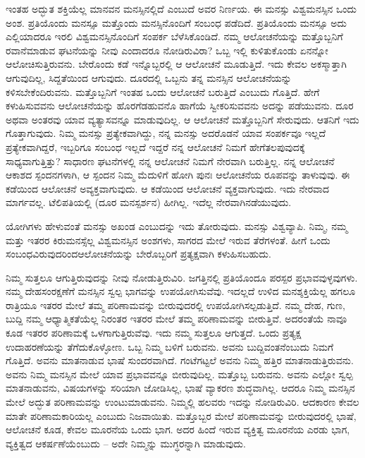 ಇಂತಹ ಅದ್ಭುತ ಶಕ್ತಿಯೆಲ್ಲ ಮಾನವನ ಮನಸ್ಸಿನಲ್ಲಿದೆ ಎಂಬುದೆ ಅವರ ನಿರ್ಣಯ. ಈ ಮನಸ್ಸು ವಿಶ್ವಮನಸ್ಸಿನ ಒಂದು ಅಂಶ. ಪ್ರತಿಯೊಂದು ಮನಸ್ಸೂ ಮತ್ತೊಂದು ಮನಸ್ಸಿನೊಂದಿಗೆ ಸಂಬಂಧ ಪಡೆದಿದೆ. ಪ್ರತಿಯೊಂದು ಮನಸ್ಸೂ ಅದು ಎಲ್ಲಿಯಾದರೂ ಇರಲಿ ವಿಶ್ವಮನಸ್ಸಿನೊಂದಿಗೆ ಸಂಪರ್ಕ ಬೆಳೆಸಿಕೊಂಡಿದೆ. ನಮ್ಮ ಆಲೋಚನೆಯನ್ನು ಮತ್ತೊಬ್ಬನಿಗೆ ರವಾನೆಮಾಡುವ ಘಟನೆಯನ್ನು ನೀವು ಎಂದಾದರೂ ನೋಡಿರುವಿರಾ? ಒಬ್ಬ ಇಲ್ಲಿ ಕುಳಿತುಕೊಂಡು ಏನನ್ನೋ ಆಲೋಚಿಸುತ್ತಿರುವನು. ಬೇರೊಂದು ಕಡೆ ಇನ್ನೊಬ್ಬರಲ್ಲಿ ಆ ಆಲೋಚನೆ ಮೂಡುತ್ತಿದೆ. ಇದು ಕೇವಲ ಅಕಸ್ಮಾತ್ತಾಗಿ ಆಗುವುದಿಲ್ಲ, ಸಿದ್ದತೆಯಿಂದ ಆಗುವುದು. ದೂರದಲ್ಲಿ ಒಬ್ಬನು ತನ್ನ ಮನಸ್ಸಿನ ಆಲೋಚನೆಯನ್ನು ಕಳಿಸಬೇಕೆಂದಿರುವನು. ಮತ್ತೊಬ್ಬನಿಗೆ ಇಂತಹ ಒಂದು ಆಲೋಚನೆ ಬರುತ್ತಿದೆ ಎಂಬುದು ಗೊತ್ತಿದೆ. ಹೇಗೆ ಕಳುಹಿಸುವವನು ಆಲೋಚನೆಯನ್ನು ಹೊರಗೆಡಹುವನೊ ಹಾಗೆಯೆ ಸ್ವೀಕರಿಸುವವನು ಅದನ್ನು ಪಡೆಯುವನು. ದೂರ ಅಥವಾ ಅಂತರವು ಯಾವ ವ್ಯತ್ಯಾಸವನ್ನೂ ಮಾಡುವುದಿಲ್ಲ. ಆ ಆಲೋಚನೆ ಮತ್ತೊಬ್ಬನಿಗೆ ಸೇರುವುದು. ಆತನಿಗೆ ಇದು ಗೊತ್ತಾಗುವುದು. ನಿಮ್ಮ ಮನಸ್ಸು ಪ್ರತ್ಯೇಕವಾಗಿದ್ದು, ನನ್ನ ಮನಸ್ಸು ಅದರೊಡನೆ ಯಾವ ಸಂಪರ್ಕವೂ ಇಲ್ಲದೆ ಪ್ರತ್ಯೇಕವಾಗಿದ್ದರೆ, ಇಬ್ಬರಿಗೂ ಸಂಬಂಧ ಇಲ್ಲದೆ ಇದ್ದರೆ ನನ್ನ ಆಲೋಚನೆ ನಿಮಗೆ ಹೇಗೆ\break ತಲಪುವುದಕ್ಕೆ ಸಾಧ್ಯವಾಗುತ್ತಿತ್ತು? ಸಾಧಾರಣ ಘಟನೆಗಳಲ್ಲಿ ನನ್ನ ಆಲೋಚನೆ ನಿಮಗೆ ನೇರವಾಗಿ ಬರುತ್ತಿಲ್ಲ. ನನ್ನ ಆಲೋಚನೆ ಆಕಾಶದ ಸ್ಪಂದನಗಳಾಗಿ, ಆ ಸ್ಪಂದನ ನಿಮ್ಮ ಮೆದುಳಿಗೆ ಹೋಗಿ ಪುನಃ ಆಲೋಚನೆಯ ರೂಪವನ್ನು ತಾಳುವುವು. ಈ ಕಡೆಯಿಂದ ಆಲೋಚನೆ ಅವ್ಯಕ್ತವಾಗುವುದು. ಆ ಕಡೆಯಿಂದ ಆಲೋಚನೆ ವ್ಯಕ್ತವಾಗುವುದು. ಇದು ನೇರವಾದ ಮಾರ್ಗವಲ್ಲ. ಟೆಲಿಪತಿಯಲ್ಲಿ (ದೂರ ಮನಸ್ಪರ್ಶನ) ಹೀಗಿಲ್ಲ. ಇದೆಲ್ಲ ನೇರವಾಗಿ\break ನಡೆಯುವುದು.

ಯೋಗಿಗಳು ಹೇಳುವಂತೆ ಮನಸ್ಸು ಅಖಂಡ ಎಂಬುದನ್ನು ಇದು ತೋರುವುದು. ಮನಸ್ಸು ವಿಶ್ವವ್ಯಾಪಿ. ನಿಮ್ಮ, ನಮ್ಮ ಮತ್ತು ಇತರರ ಕಿರುಮನಸ್ಸೆಲ್ಲ ವಿಶ್ವಮನಸ್ಸಿನ ಅಂಶಗಳು, ಸಾಗರದ ಮೇಲೆ ಇರುವ ತೆರೆಗಳಂತೆ. ಹೀಗೆ ಒಂದು ಸಂಬಂಧವಿರುವುದರಿಂದ\break ಆಲೋಚನೆಯನ್ನು ಬೇರೊಬ್ಬರಿಗೆ ಪ್ರತ್ಯಕ್ಷವಾಗಿ ಕಳುಹಿಸಬಹುದು.

ನಿಮ್ಮ ಸುತ್ತಲೂ ಆಗುತ್ತಿರುವುದನ್ನು ನೀವು ನೋಡುತ್ತಿರುವಿರಿ. ಜಗತ್ತಿನಲ್ಲಿ ಪ್ರತಿಯೊಂದೂ ಪರಸ್ಪರ ಪ್ರಭಾವವುಳ್ಳವುಗಳು. ನಮ್ಮ ದೇಹಸಂರಕ್ಷಣೆಗೆ ಮನಸ್ಸಿನ ಸ್ವಲ್ಪ ಭಾಗವನ್ನು ಉಪಯೋಗಿಸುವೆವು. ಇದಲ್ಲದೆ ಉಳಿದ ಮನಶ್ಶಕ್ತಿಯೆಲ್ಲ ಹಗಲೂ ರಾತ್ರಿಯೂ ಇತರರ ಮೇಲೆ ತಮ್ಮ ಪರಿಣಾಮವನ್ನು ಬೀರುವುದರಲ್ಲಿ ಉಪಯೋಗಿಸಲ್ಪಡುತ್ತಿದೆ. ನಮ್ಮ ದೇಹ, ಗುಣ, ಬುದ್ದಿ ನಮ್ಮ ಆಧ್ಯಾತ್ಮಿಕತೆಯೆಲ್ಲ ನಿರಂತರ ಇತರರ ಮೇಲೆ ತಮ್ಮ ಪರಿಣಾಮವನ್ನು ಬೀರುತ್ತಿವೆ. ಅದರಂತೆಯೆ ನಾವೂ ಕೂಡ ಇತರರ ಪರಿಣಾಮಕ್ಕೆ ಒಳಗಾಗುತ್ತಿರುವೆವು. ಇದು ನಮ್ಮ ಸುತ್ತಲೂ ಆಗುತ್ತದೆ. ಒಂದು ಪ್ರತ್ಯಕ್ಷ ಉದಾಹರಣೆಯನ್ನು ತೆಗೆದುಕೊಳ್ಳೋಣ. ಒಬ್ಬ ನಿಮ್ಮ ಬಳಿಗೆ ಬರುವನು. ಅವನು ಬುದ್ದಿವಂತನೆಂಬುದು ನಿಮಗೆ ಗೊತ್ತಿದೆ. ಅವನು ಮಾತನಾಡುವ ಭಾಷೆ ಸುಂದರವಾಗಿದೆ. ಗಂಟೆಗಟ್ಟಲೆ ಅವನು ನಿಮ್ಮ ಹತ್ತಿರ ಮಾತನಾಡುತ್ತಿರುವನು. ಅವನು ನಿಮ್ಮ ಮನಸ್ಸಿನ ಮೇಲೆ ಯಾವ ಪ್ರಭಾವವನ್ನೂ ಬೀರುವುದಿಲ್ಲ. ಮತ್ತೊಬ್ಬ ಬರುವನು. ಅವನು ಎಲ್ಲೋ ಸ್ವಲ್ಪ ಮಾತನಾಡುವನು, ವಿಷಯಗಳನ್ನು ಸರಿಯಾಗಿ ಜೋಡಿಸಿಲ್ಲ, ಭಾಷೆ ವ್ಯಾಕರಣ ಶುದ್ಧವಾಗಿಲ್ಲ. ಆದರೂ ನಿಮ್ಮ ಮನಸ್ಸಿನ ಮೇಲೆ ಅದ್ಭುತ ಪರಿಣಾಮವನ್ನು ಉಂಟುಮಾಡುವನು. ನಿಮ್ಮಲ್ಲಿ ಹಲವರು ಇದನ್ನು ನೋಡಿರುವಿರಿ. ಆದಕಾರಣ ಕೇವಲ ಮಾತೇ ಪರಿಣಾಮಕಾರಿಯಲ್ಲ ಎಂಬುದು ನಿಜವಾಯಿತು. ಮತ್ತೊಬ್ಬರ ಮೇಲೆ ಪರಿಣಾಮವನ್ನು ಬೀರುವುದರಲ್ಲಿ ಭಾಷೆ, ಆಲೋಚನೆ ಕೂಡ, ಕೇವಲ ಮೂರನೆಯ ಒಂದು ಭಾಗ. ಅದರ ಹಿಂದೆ ಇರುವ ವ್ಯಕ್ತಿತ್ವ ಮೂರನೆಯ ಎರಡು ಭಾಗ, ವ್ಯಕ್ತಿತ್ವದ ಆಕರ್ಷಣೆಯೆಂಬುದು – ಅದೇ ನಿಮ್ಮನ್ನು ಮುಗ್ಧರನ್ನಾಗಿ ಮಾಡುವುದು.

